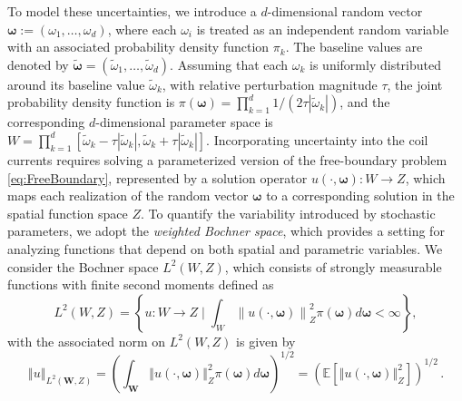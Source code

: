 To model these uncertainties, we introduce a $d$-dimensional random vector $\boldsymbol \omega :=(\omega_1,\ldots,\omega_d)$, where each $\omega_i$ is treated as an independent random variable with an associated probability density function $\pi_k$. The baseline values are denoted by $\boldsymbol{\widetilde{\omega}} = (\widetilde{\omega}_1, \ldots, \widetilde{\omega}_d)$.  Assuming that each $\omega_k$ is uniformly distributed around its baseline value $\widetilde{\omega}_k$, with relative perturbation magnitude $\tau$, the joint probability density function is $\pi \left(\boldsymbol{\omega}\right)=\prod_{k=1}^{d} 1/(2\tau |\widetilde{\omega}_k|)$, and the corresponding $d$-dimensional parameter space is $W=\prod_{k=1}^{d}\left[\widetilde{\omega}_k-\tau \left\vert \widetilde{\omega}_k\right\vert,\widetilde{\omega}_k+\tau \left\vert \widetilde{\omega}_k \right\vert\right]$.
Incorporating uncertainty into the coil currents requires solving a parameterized version of the free-boundary problem \eqref{eq:FreeBoundary}, represented by a solution operator $u(\cdot, \boldsymbol{\omega}): W \to Z$, which maps each realization of the random vector $\boldsymbol \omega$ to a corresponding solution in the spatial function space $Z$. To quantify the variability introduced by stochastic parameters, we adopt the {\it weighted Bochner space}, which provides a setting for analyzing functions that depend on both spatial and parametric variables. We consider the Bochner space $L^2(W,Z)$, which consists of strongly measurable functions with finite second moments defined as
%
\[
L^2(W,Z) = \left\{u:W\rightarrow Z\; \bigg\vert \;\int_{W}\left\|u(\cdot,\boldsymbol{\omega})\right\|_{Z}^2\pi(\boldsymbol{\omega})d\boldsymbol{\omega}<\infty\right\},
\]
%
with the associated norm on $L^2(W,Z)$ is given by
%
\[
\left\Vert u \right\Vert_{L^2(\boldsymbol W,Z)} =
    \left(\int_{\boldsymbol W} \left\Vert u(\cdot,\boldsymbol{\omega})  \right\Vert_{Z}^2 \pi(\boldsymbol{\omega})d\boldsymbol{\omega} \right)^{1/2} = \left(\mathbb{E}\left[\left\Vert u(\cdot,\boldsymbol{\omega})  \right\Vert_{Z}^2\right]\right)^{1/2}\,. 
\]
%

